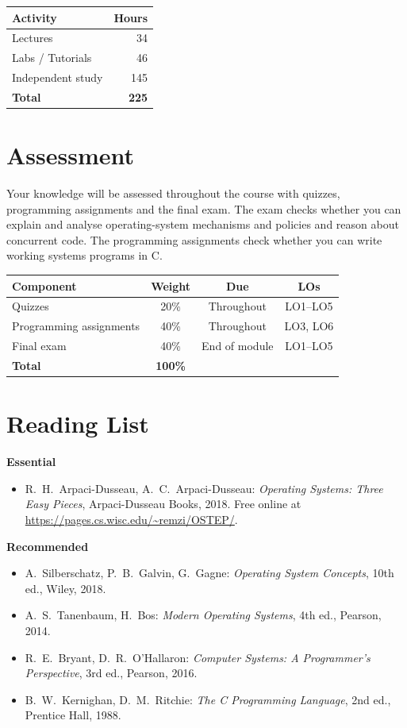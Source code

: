 \documentclass[11pt,a4paper]{article}
\begin{document}
\begin{tabularx}{0.6\textwidth}{X r}
\toprule
\textbf{Activity} & \textbf{Hours} \\
\midrule
Lectures            & 34 \\
Labs / Tutorials    & 46 \\
Independent study   & 145 \\
\midrule
\textbf{Total}      & \textbf{225} \\
\bottomrule
\end{tabularx}

\section{Assessment}
Your knowledge will be assessed throughout the course with quizzes, programming
assignments and the final exam. The exam checks whether you can explain and analyse
operating-system mechanisms and policies and reason about concurrent code. The
programming assignments check whether you can write working systems programs in C.

\begin{tabularx}{\textwidth}{X c c c}
\toprule
\textbf{Component} & \textbf{Weight} & \textbf{Due} & \textbf{LOs} \\
\midrule
Quizzes & 20\% & Throughout & LO1--LO5 \\
Programming assignments & 40\% & Throughout & LO3, LO6 \\
Final exam & 40\% & End of module & LO1--LO5 \\
\midrule
\textbf{Total} & \textbf{100\%} & & \\
\bottomrule
\end{tabularx}

\section{Reading List}
\textbf{Essential}
\begin{itemize}
  \item R.\ H.\ Arpaci-Dusseau, A.\ C.\ Arpaci-Dusseau: \textit{Operating Systems: Three Easy Pieces}, Arpaci-Dusseau Books, 2018. Free online at \url{https://pages.cs.wisc.edu/~remzi/OSTEP/}.
\end{itemize}
\textbf{Recommended}
\begin{itemize}
  \item A.\ Silberschatz, P.\ B.\ Galvin, G.\ Gagne: \textit{Operating System Concepts}, 10th ed., Wiley, 2018.
  \item A.\ S.\ Tanenbaum, H.\ Bos: \textit{Modern Operating Systems}, 4th ed., Pearson, 2014.
  \item R.\ E.\ Bryant, D.\ R.\ O'Hallaron: \textit{Computer Systems: A Programmer's Perspective}, 3rd ed., Pearson, 2016.
  \item B.\ W.\ Kernighan, D.\ M.\ Ritchie: \textit{The C Programming Language}, 2nd ed., Prentice Hall, 1988.
\end{itemize}
\end{document}

